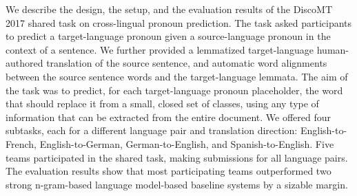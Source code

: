 We describe the design, the setup, and the evaluation results of the DiscoMT 2017 shared task on cross-lingual pronoun prediction. The task asked participants to predict a target-language pronoun given a source-language pronoun in the context of a sentence. We further provided a lemmatized target-language human-authored translation of the source sentence, and automatic word alignments between the source sentence words and the target-language lemmata. The aim of the task was to predict, for each target-language pronoun placeholder, the word that should replace it from a small, closed set of classes, using any type of information that can be extracted from the entire document. We offered four subtasks, each for a different language pair and translation direction: English-to-French, English-to-German, German-to-English, and Spanish-to-English. Five teams participated in the shared task, making submissions for all language pairs. The evaluation results show that most participating teams outperformed two strong n-gram-based language model-based baseline systems by a sizable margin.
